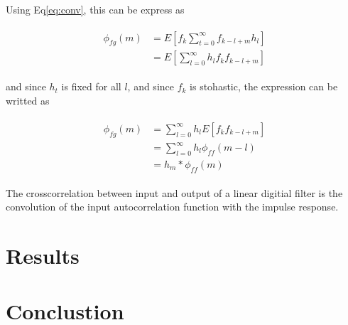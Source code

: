 \documentclass[8pt,a4paper]{article}
\begin{document}
\begin{multicols}{2}
Using Eq\ref{eq:conv}, this can be express as

\begin{align}
  \begin{split}
    \phi_{fg}(m) &= E \left[ f_{k} \sum_{t=0}^{\infty} f_{k-l+m}h_{l} \right]\\
    &= E \left[ \sum_{l=0}^{\infty} h_{l} f_{k} f_{k-l+m} \right]
  \end{split}
\end{align}

and since $h_{t}$ is fixed for all $ l $, and since $f_{k}$ is stohastic, the expression can be writted as

\begin{align}
  \label{eq:input_output_crosscorrelation}
  \begin{split}
    \phi_{fg}(m) &= \sum_{l=0}^{\infty} h_{l} E \left[ f_{k} f_{k-l+m} \right] \\
    &= \sum_{l=0}^{\infty} h_{l} \phi_{ff}(m-l) \\
    &= h_{m} * \phi_{ff}(m)
  \end{split}
\end{align}

The crosscorrelation between input and output of a linear digitial filter is the convolution of the input autocorrelation function with the impulse response.


\section*{Results}

\section*{Conclustion}

 \label{sec:references}
\newpage


\end{multicols}
\end{document}
